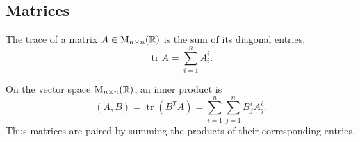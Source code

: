 \subsection{Matrices}

\begin{definition}
  The trace of a matrix \(A\in\mathrm M_{n\times n}(\mathbb{R})\) is the sum
  of its diagonal entries,
  \[
    \operatorname{tr}A=\sum_{i=1}^n A^i_i.
  \]
\end{definition}

\begin{example}
  On the vector space \(\mathrm M_{n\times n}(\mathbb{R})\), an inner product is
  \[
    (A,B)=\operatorname{tr}(B^TA)
      =\sum_{i=1}^n\sum_{j=1}^n B^i_jA^i_j.
  \]
  Thus matrices are paired by summing the products of their corresponding
  entries.
\end{example}
